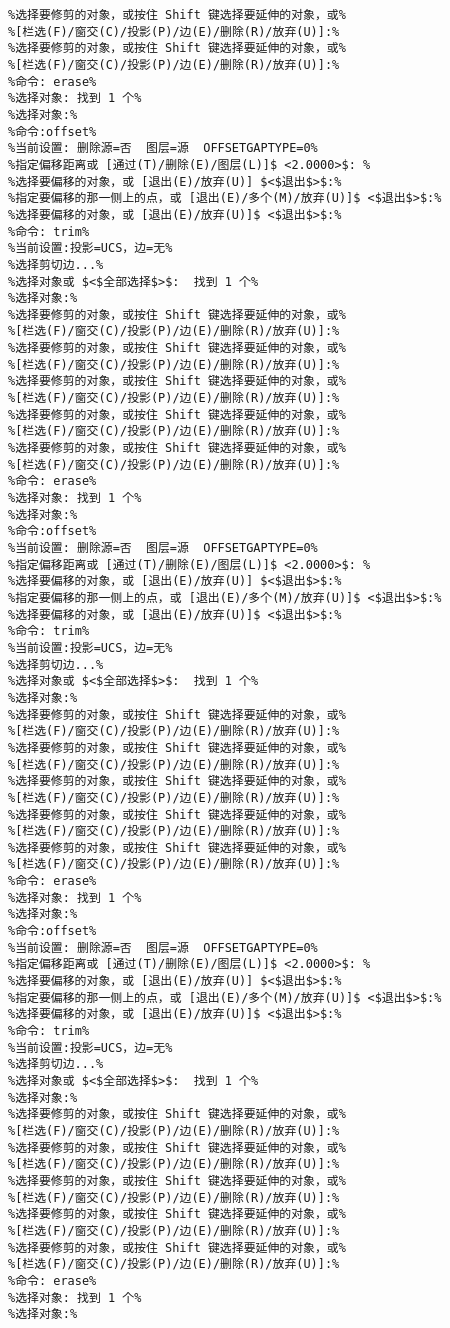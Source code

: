\begin{lstlisting}
%选择要修剪的对象，或按住 Shift 键选择要延伸的对象，或%
%[栏选(F)/窗交(C)/投影(P)/边(E)/删除(R)/放弃(U)]:%
%选择要修剪的对象，或按住 Shift 键选择要延伸的对象，或%
%[栏选(F)/窗交(C)/投影(P)/边(E)/删除(R)/放弃(U)]:%
%命令: erase%
%选择对象: 找到 1 个%
%选择对象:%
%命令:offset%
%当前设置: 删除源=否  图层=源  OFFSETGAPTYPE=0%
%指定偏移距离或 [通过(T)/删除(E)/图层(L)]$ <2.0000>$: %
%选择要偏移的对象，或 [退出(E)/放弃(U)] $<$退出$>$:%
%指定要偏移的那一侧上的点，或 [退出(E)/多个(M)/放弃(U)]$ <$退出$>$:%
%选择要偏移的对象，或 [退出(E)/放弃(U)]$ <$退出$>$:%
%命令: trim%
%当前设置:投影=UCS，边=无%
%选择剪切边...%
%选择对象或 $<$全部选择$>$:  找到 1 个%
%选择对象:%
%选择要修剪的对象，或按住 Shift 键选择要延伸的对象，或%
%[栏选(F)/窗交(C)/投影(P)/边(E)/删除(R)/放弃(U)]:%
%选择要修剪的对象，或按住 Shift 键选择要延伸的对象，或%
%[栏选(F)/窗交(C)/投影(P)/边(E)/删除(R)/放弃(U)]:%
%选择要修剪的对象，或按住 Shift 键选择要延伸的对象，或%
%[栏选(F)/窗交(C)/投影(P)/边(E)/删除(R)/放弃(U)]:%
%选择要修剪的对象，或按住 Shift 键选择要延伸的对象，或%
%[栏选(F)/窗交(C)/投影(P)/边(E)/删除(R)/放弃(U)]:%
%选择要修剪的对象，或按住 Shift 键选择要延伸的对象，或%
%[栏选(F)/窗交(C)/投影(P)/边(E)/删除(R)/放弃(U)]:%
%命令: erase%
%选择对象: 找到 1 个%
%选择对象:%
%命令:offset%
%当前设置: 删除源=否  图层=源  OFFSETGAPTYPE=0%
%指定偏移距离或 [通过(T)/删除(E)/图层(L)]$ <2.0000>$: %
%选择要偏移的对象，或 [退出(E)/放弃(U)] $<$退出$>$:%
%指定要偏移的那一侧上的点，或 [退出(E)/多个(M)/放弃(U)]$ <$退出$>$:%
%选择要偏移的对象，或 [退出(E)/放弃(U)]$ <$退出$>$:%
%命令: trim%
%当前设置:投影=UCS，边=无%
%选择剪切边...%
%选择对象或 $<$全部选择$>$:  找到 1 个%
%选择对象:%
%选择要修剪的对象，或按住 Shift 键选择要延伸的对象，或%
%[栏选(F)/窗交(C)/投影(P)/边(E)/删除(R)/放弃(U)]:%
%选择要修剪的对象，或按住 Shift 键选择要延伸的对象，或%
%[栏选(F)/窗交(C)/投影(P)/边(E)/删除(R)/放弃(U)]:%
%选择要修剪的对象，或按住 Shift 键选择要延伸的对象，或%
%[栏选(F)/窗交(C)/投影(P)/边(E)/删除(R)/放弃(U)]:%
%选择要修剪的对象，或按住 Shift 键选择要延伸的对象，或%
%[栏选(F)/窗交(C)/投影(P)/边(E)/删除(R)/放弃(U)]:%
%选择要修剪的对象，或按住 Shift 键选择要延伸的对象，或%
%[栏选(F)/窗交(C)/投影(P)/边(E)/删除(R)/放弃(U)]:%
%命令: erase%
%选择对象: 找到 1 个%
%选择对象:%
%命令:offset%
%当前设置: 删除源=否  图层=源  OFFSETGAPTYPE=0%
%指定偏移距离或 [通过(T)/删除(E)/图层(L)]$ <2.0000>$: %
%选择要偏移的对象，或 [退出(E)/放弃(U)] $<$退出$>$:%
%指定要偏移的那一侧上的点，或 [退出(E)/多个(M)/放弃(U)]$ <$退出$>$:%
%选择要偏移的对象，或 [退出(E)/放弃(U)]$ <$退出$>$:%
%命令: trim%
%当前设置:投影=UCS，边=无%
%选择剪切边...%
%选择对象或 $<$全部选择$>$:  找到 1 个%
%选择对象:%
%选择要修剪的对象，或按住 Shift 键选择要延伸的对象，或%
%[栏选(F)/窗交(C)/投影(P)/边(E)/删除(R)/放弃(U)]:%
%选择要修剪的对象，或按住 Shift 键选择要延伸的对象，或%
%[栏选(F)/窗交(C)/投影(P)/边(E)/删除(R)/放弃(U)]:%
%选择要修剪的对象，或按住 Shift 键选择要延伸的对象，或%
%[栏选(F)/窗交(C)/投影(P)/边(E)/删除(R)/放弃(U)]:%
%选择要修剪的对象，或按住 Shift 键选择要延伸的对象，或%
%[栏选(F)/窗交(C)/投影(P)/边(E)/删除(R)/放弃(U)]:%
%选择要修剪的对象，或按住 Shift 键选择要延伸的对象，或%
%[栏选(F)/窗交(C)/投影(P)/边(E)/删除(R)/放弃(U)]:%
%命令: erase%
%选择对象: 找到 1 个%
%选择对象:%
\end{lstlisting}
